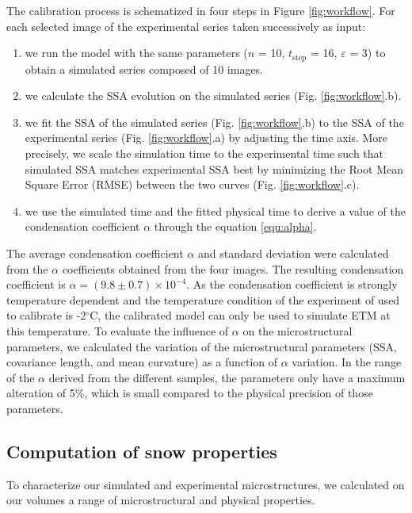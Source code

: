 \documentclass[draft,ms]{agujournal2019}
\begin{document}
The calibration process is schematized in four steps in Figure \ref{fig:workflow}. For each selected image of the experimental series taken successively as input:
\begin{enumerate}
    \item we run the model with the same parameters ($n$ = 10, $t_{\mathrm{step}}$ = 16, $\varepsilon$ = 3) to obtain a simulated series composed of 10 images. 
    \item we calculate the SSA evolution on the simulated series (Fig. \ref{fig:workflow}.b).
    \item we fit the SSA of the simulated series (Fig. \ref{fig:workflow}.b) to the SSA of the experimental series (Fig. \ref{fig:workflow}.a) by adjusting the time axis. More precisely, we scale the simulation time to the experimental time such that simulated SSA matches experimental SSA best by minimizing the Root Mean Square Error (RMSE) between the two curves (Fig. \ref{fig:workflow}.c).   
    \item we use the simulated time and the fitted physical time to derive a value of the condensation coefficient $\alpha$ through the equation \eqref{equ:alpha}. 
\end{enumerate}

The average condensation coefficient $\alpha$ and standard deviation were calculated from the $\alpha$ coefficients obtained from the four images. The resulting condensation coefficient is $\alpha = ( 9.8 \pm 0.7)\times 10^{-4}$. As the condensation coefficient is strongly temperature dependent and the temperature condition of the experiment of  used to calibrate is -2$^\circ$C, the calibrated model can only be used to simulate ETM at this temperature. To evaluate the influence of $\alpha$ on the microstructural parameters, we calculated the variation of the microstructural parameters (SSA, covariance length, and mean curvature) as a function of $\alpha$ variation. In the range of the $\alpha$ derived from the different samples, the parameters only have a maximum alteration of 5\%, which is small compared to the physical precision of those parameters. 

\subsection{Computation of snow properties}
\label{subsec:methode_physical_appli}

To characterize our simulated and experimental microstructures, we calculated on our volumes a range of microstructural and physical properties.
\end{document}
